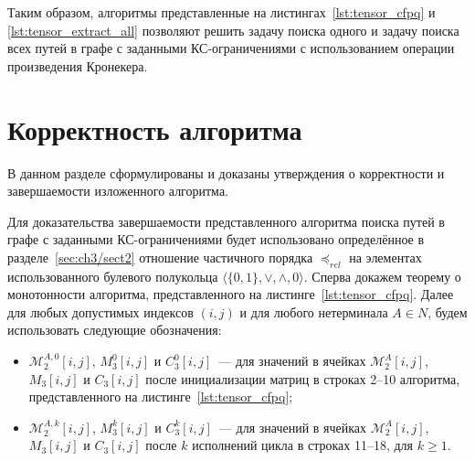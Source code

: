 Таким образом, алгоритмы представленные на листингах~\ref{lst:tensor_cfpq} и \ref{lst:tensor_extract_all} позволяют решить задачу поиска одного и задачу поиска всех путей в графе с заданными КС-ограничениями с использованием операции произведения Кронекера.


\section{Корректность алгоритма}\label{sec:ch4/sect2}
В данном разделе сформулированы и доказаны утверждения о корректности и завершаемости изложенного алгоритма.

Для доказательства завершаемости представленного алгоритма поиска путей в графе с заданными КС-ограничениями будет использовано определённое в разделе~\ref{sec:ch3/sect2} отношение частичного порядка $\preceq_{\textit{rel}}$ на элементах использованного булевого полукольца $\langle \{0, 1\}, \vee, \wedge, 0 \rangle$. Сперва докажем теорему о монотонности алгоритма, представленного на листинге~\ref{lst:tensor_cfpq}. Далее для любых допустимых индексов $(i, j)$ и для любого нетерминала $A \in N$, будем использовать следующие обозначения:

\begin{itemize}
    \item $\mathcal{M}_2^{A, 0}[i, j]$, $M_3^{0}[i, j]$ и $C_3^{0}[i, j]$~--- для значений в ячейках $\mathcal{M}_2^{A}[i, j]$, $M_3[i, j]$ и $C_3[i, j]$ после инициализации матриц в строках 2--10 алгоритма, представленного на листинге~\ref{lst:tensor_cfpq};
    \item $\mathcal{M}_2^{A, k}[i, j]$, $M_3^{k}[i, j]$ и $C_3^{k}[i, j]$~--- для значений в ячейках $\mathcal{M}_2^{A}[i, j]$, $M_3[i, j]$ и $C_3[i, j]$ после $k$ исполнений цикла в строках 11--18, для $k \geq 1$.
\end{itemize}

